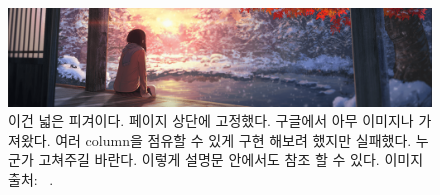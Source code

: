 \begin{figure}[t]
\includegraphics[width=\linewidth]{images/wide.png}
\caption{이건 넓은 피겨이다. 페이지 상단에 고정했다. 구글에서 아무 이미지나 가져왔다. 여러 column을 점유할 수 있게 구현 해보려 했지만 실패했다. 누군가 고쳐주길 바란다. 이렇게 설명문 안에서도 참조 할 수 있다. 이미지 출처: ~\cite{wide_wallpaper}.}
\label{fig:wide}
\end{figure}





